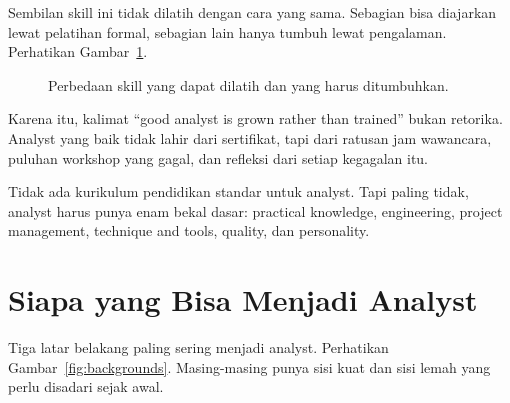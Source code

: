 \documentclass[11pt,a4paper]{article}
\begin{document}
Sembilan skill ini tidak dilatih dengan cara yang sama. Sebagian bisa diajarkan lewat pelatihan formal, sebagian lain hanya tumbuh lewat pengalaman. Perhatikan Gambar~\ref{fig:train-vs-grow}.

\begin{figure}[H]
	\centering
	\caption{Perbedaan skill yang dapat dilatih dan yang harus ditumbuhkan.}
	\label{fig:train-vs-grow}
\end{figure}

Karena itu, kalimat ``good analyst is grown rather than trained'' bukan retorika. Analyst yang baik tidak lahir dari sertifikat, tapi dari ratusan jam wawancara, puluhan workshop yang gagal, dan refleksi dari setiap kegagalan itu.

Tidak ada kurikulum pendidikan standar untuk analyst. Tapi paling tidak, analyst harus punya enam bekal dasar: practical knowledge, engineering, project management, technique and tools, quality, dan personality.

\section{Siapa yang Bisa Menjadi Analyst}

Tiga latar belakang paling sering menjadi analyst. Perhatikan Gambar~\ref{fig:backgrounds}. Masing-masing punya sisi kuat dan sisi lemah yang perlu disadari sejak awal.
\end{document}
